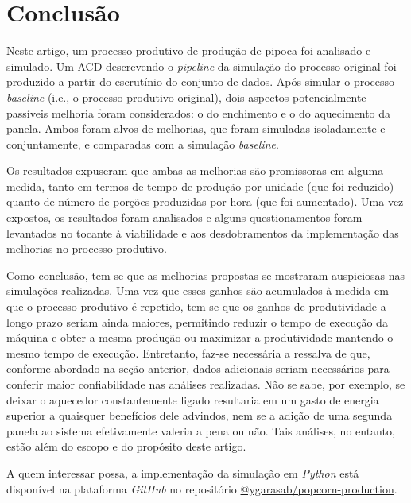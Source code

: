 \documentclass[12pt]{article}
\begin{document}

\section{Conclusão}
\label{sec:conclusao}

Neste artigo, um processo produtivo de produção de pipoca foi analisado e simulado. Um ACD descrevendo o \textit{pipeline} da simulação do processo original foi produzido a partir do escrutínio do conjunto de dados. Após simular o processo \textit{baseline} (i.e., o processo produtivo original), dois aspectos potencialmente passíveis melhoria foram considerados: o do enchimento e o do aquecimento da panela. Ambos foram alvos de melhorias, que foram simuladas isoladamente e conjuntamente, e comparadas com a simulação \textit{baseline}.

Os resultados expuseram que ambas as melhorias são promissoras em alguma medida, tanto em termos de tempo de produção por unidade (que foi reduzido) quanto de número de porções produzidas por hora (que foi aumentado). Uma vez expostos, os resultados foram analisados e alguns questionamentos foram levantados no tocante à viabilidade e aos desdobramentos da implementação das melhorias no processo produtivo.

Como conclusão, tem-se que as melhorias propostas se mostraram auspiciosas nas simulações realizadas. Uma vez que esses ganhos são acumulados à medida em que o processo produtivo é repetido, tem-se que os ganhos de produtividade a longo prazo seriam ainda maiores, permitindo reduzir o tempo de execução da máquina e obter a mesma produção ou maximizar a produtividade mantendo o mesmo tempo de execução. Entretanto, faz-se necessária a ressalva de que, conforme abordado na seção anterior, dados adicionais seriam necessários para conferir maior confiabilidade nas análises realizadas. Não se sabe, por exemplo, se deixar o aquecedor constantemente ligado resultaria em um gasto de energia superior a quaisquer benefícios dele advindos, nem se a adição de uma segunda panela ao sistema efetivamente valeria a pena ou não. Tais análises, no entanto, estão além do escopo e do propósito deste artigo.

A quem interessar possa, a implementação da simulação em \textit{Python} está disponível na plataforma \textit{GitHub} no repositório \href{https://github.com/ygarasab/popcorn-production}{@ygarasab/popcorn-production}.



\end{document}

